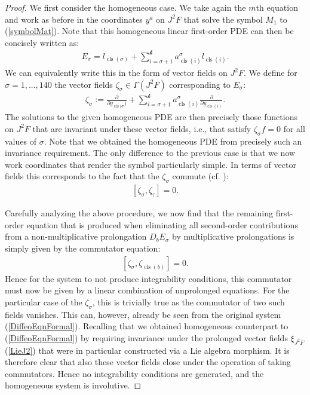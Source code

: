 \begin{proof}
We first consider the homogeneous case. We take again the $m$th equation and work as before in the coordinates $y^a$ on $J^2F$ that solve the symbol $M_1$ to (\ref{symbolMat}). Note that this homogeneous linear first-order PDE can then be concisely written as:
\begin{align}
    E_{\sigma} = l_{\operatorname{cls}(\sigma)} + \sum_{i = \sigma+1}^{\mathcal{k}} a^{\sigma}_{\operatorname{cls}(i)} l_{\operatorname{cls}(i) } .
\end{align}
We can equivalently write this in the form of vector fields on $J^2F$. We define for $\sigma = 1,...,140$ the vector fields $\zeta_{\sigma} \in \Gamma(J^2F) $ corresponding to $E_{\sigma}$:
\begin{align}
    \zeta_{\sigma} := \frac{\partial}{\partial y_{\operatorname{cls}(\sigma})} + \sum_{i = \sigma+1}^{\mathcal{k}} a^{\sigma}_{\operatorname{cls}(i)} \frac{\partial}{\partial y_{\operatorname{cls}(i)}}.
\end{align}
The solutions to the given homogeneous PDE are then precisely those functions on $J^2F$ that are invariant under these vector fields, i.e., that satisfy $\zeta_{\sigma} f = 0$ for all values of $\sigma$.
Note that we obtained the homogeneous PDE from precisely such an invariance requirement. The only difference to the previous case is that we now work coordinates that render the symbol particularly simple. 
In terms of vector fields this corresponds to the fact that the $\zeta_{\sigma}$ commute (cf. \cite{seiler1994analysis}):
\begin{align}
    \left [ \zeta_{\sigma}, \zeta_{\tau}\right ] =0.
\end{align}

Carefully analyzing the above procedure, we now find that the remaining first-order equation that is produced when eliminating all second-order contributions from a non-multiplicative prolongation $D_bE_{\sigma}$ by multiplicative prolongations is simply given by the commutator equation:
\begin{align}
    \left [\zeta_{\sigma}, \zeta_{\operatorname{cls}(b)} \right] = 0.
\end{align}
Hence for the system to not produce integrability conditions, this commutator must now be given by a linear combination of unprolonged equations. For the particular case of the $\zeta_{\sigma}$, this is trivially true as the commutator of two such fields vanishes. This can, however, already be seen from the original system (\ref{DiffeoEqnFormal}).
Recalling that we obtained homogeneous counterpart to (\ref{DiffeoEqnFormal}) by requiring invariance under the prolonged vector fields $\xi_{J^2F}$ (\ref{LieJ2}) that were in particular constructed via a Lie algebra morphism. It is therefore clear that also these vector fields close under the operation of taking commutators. Hence no integrability conditions are generated, and the homogeneous system is involutive.


\end{proof}
